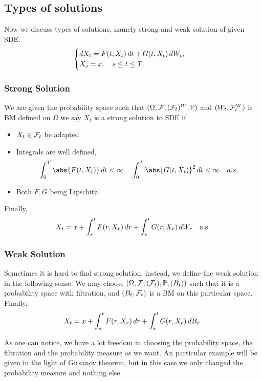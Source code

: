 \subsection{Types of solutions}
Now we discuss types of solutions, namely strong and weak solution of given SDE.
\begin{equation*}
    \begin{cases}
        \mathop{}\!d X_t = F(t,X_t) \mathop{}\!d t + G(t,X_t) \mathop{}\!d W_t, \\
        X_s = x,\quad  s\leq t \leq T.
    \end{cases}
\end{equation*}
\subsubsection{Strong Solution}
We are given the probability space such that $(\Omega, \mathcal{F}, (\mathcal{F}_t)^W, \mathbb{P})$ and $(W_t, \mathcal{F}_t^W)$ is BM defined on $\Omega$ we say $X_t$ is a strong solution to SDE if
\begin{itemize}
    \item $X_t\in\mathcal{F}_t$ be adapted.
    \item Integrals are well defined,
    \begin{equation*}
        \int_0^T \abs{F(t, X_t)} \diff t < \infty \quad \int_0^T \abs{G(t, X_t)}^2 \diff t < \infty \quad a.s.
    \end{equation*}
    \item Both $F, G$ being Lipschitz.
\end{itemize}
Finally, 
\begin{equation*}
    X_t = x + \int_s^t F(r,X_r) \mathop{}\!d r+\int_s^t G(r,X_r) \mathop{}\!d W_r \quad \text{a.s.}
\end{equation*}

\subsubsection{Weak Solution}
Sometimes it is hard to find strong solution, instead, we define the weak solution in the following sense. We may choose $(\Omega, \mathcal{F}, (\mathcal{F}_t), \mathbb{P}, (B_t))$ such that it is a probability space with filtration, and $(B_t, \mathcal{F}_t)$ is a BM on this particular space. Finally, 
\begin{equation*}
    X_t = x + \int_s^t F(r,X_r) \mathop{}\!d r+\int_s^t G(r,X_r) \mathop{}\!d B_r.
\end{equation*}

\begin{rem}
As one can notice, we have a lot freedom in choosing the probability space, the filtration and the probability measure as we want. An particular example will be given in the light of Girsanov theorem, but in this case we only changed the probability measure and nothing else.
\end{rem}


